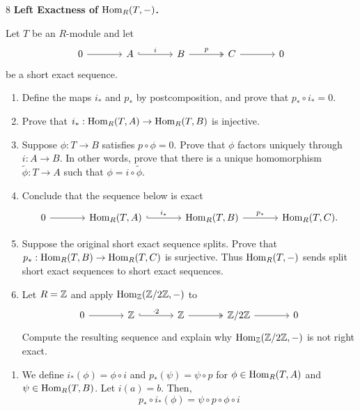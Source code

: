 \documentclass[Notebook.tex]{subfiles}
\begin{document}
\begin{problem}{8} 
    \textbf{Left Exactness of $\operatorname{Hom}_R(T,-)$.} 
    
    Let $T$ be an $R$-module and let
    \[
    \begin{tikzcd}[column sep=large]
    0 \arrow[r] & A \arrow[r, hook, "i"] & B \arrow[r, two heads, "p"] & C \arrow[r] & 0
    \end{tikzcd}
    \]
    be a short exact sequence.
    \begin{enumerate}
    \item Define the maps $i_*$ and $p_*$ by postcomposition, and prove that $p_*\circ i_*=0$.
    \item Prove that $i_*:\operatorname{Hom}_R(T,A)\to \operatorname{Hom}_R(T,B)$ is injective.
    \item Suppose $\phi:T\to B$ satisfies $p\circ \phi=0$. Prove that $\phi$ factors uniquely through $i:A\to B$. In other words, prove that there is a unique homomorphism $\widetilde{\phi}:T\to A$ such that $\phi=i\circ \widetilde{\phi}$.
    \item Conclude that the sequence below is exact
    \[
    \begin{tikzcd}[column sep=large]
    0 \arrow[r] & \Hom_R(T,A) \arrow[r, hook, "i_*"] & \Hom_R(T,B) \arrow[r, "p_*"] & \Hom_R(T,C).
    \end{tikzcd}
    \]
    \item Suppose the original short exact sequence splits. Prove that $p_*:\operatorname{Hom}_R(T,B)\to \operatorname{Hom}_R(T,C)$ is surjective. Thus $\operatorname{Hom}_R(T,-)$ sends split short exact sequences to short exact sequences.
    \item Let $R=\mathbb Z$ and apply $\operatorname{Hom}_{\mathbb Z}(\mathbb Z/2\mathbb Z,-)$ to
    \[
    \begin{tikzcd}[column sep=large]
    0 \arrow[r] & \Z \arrow[r, hook, "\cdot 2"] & \Z \arrow[r, two heads] & \Z/2\Z \arrow[r] & 0
    \end{tikzcd}
    \]
    Compute the resulting sequence and explain why $\operatorname{Hom}_{\mathbb Z}(\mathbb Z/2\mathbb Z,-)$ is not right exact.
    \end{enumerate}
\end{problem}

\begin{solution}
    \bbni
    \begin{enumerate}
        \item We define $i_* (\phi) = \phi \circ i$ and $p_*(\psi) = \psi \circ p$ for $\phi \in \operatorname{Hom}_R(T, A)$ and $\psi \in \operatorname{Hom}_R(T, B)$. Let $i(a) = b$. Then, 
        \[p_* \circ i_* (\phi) = \psi \circ p \circ \phi \circ i\]
    \end{enumerate}
\end{solution}
\end{document}
